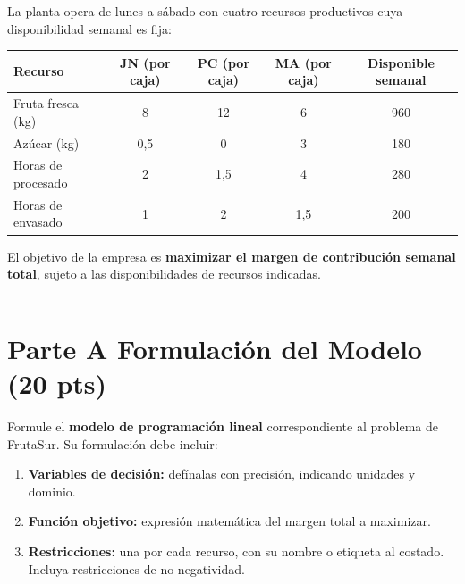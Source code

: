 \documentclass[12pt,a4paper]{article}
\begin{document}
La planta opera de lunes a sábado con cuatro recursos productivos cuya
disponibilidad semanal es fija:

\begin{center}
\renewcommand{\arraystretch}{1.25}
\begin{tabular}{lcccc}
\toprule
\textbf{Recurso} &
\textbf{JN (por caja)} &
\textbf{PC (por caja)} &
\textbf{MA (por caja)} &
\textbf{Disponible semanal} \\
\midrule
Fruta fresca (kg)    & 8     & 12   & 6    & 960  \\
Azúcar (kg)          & 0{,}5 & 0    & 3    & 180  \\
Horas de procesado   & 2     & 1{,}5 & 4   & 280  \\
Horas de envasado    & 1     & 2    & 1{,}5 & 200 \\
\bottomrule
\end{tabular}
\end{center}

El objetivo de la empresa es \textbf{maximizar el margen de contribución
semanal total}, sujeto a las disponibilidades de recursos indicadas.

\noindent\rule{\linewidth}{0.4pt}

\section*{Parte A \quad Formulación del Modelo \hfill\normalfont\normalsize(20 pts)}

Formule el \textbf{modelo de programación lineal} correspondiente al problema
de FrutaSur. Su formulación debe incluir:

\begin{enumerate}[label=\alph*), leftmargin=*, topsep=2pt]
    \item \textbf{Variables de decisión:} defínalas con precisión, indicando
          unidades y dominio.
    \item \textbf{Función objetivo:} expresión matemática del margen total a
          maximizar.
    \item \textbf{Restricciones:} una por cada recurso, con su nombre o
          etiqueta al costado. Incluya restricciones de no negatividad.
\end{enumerate}
\end{document}
